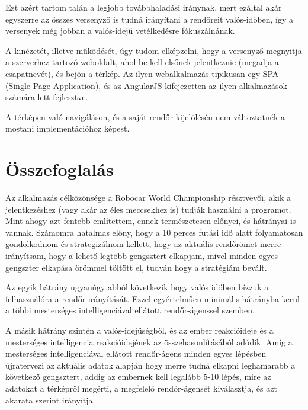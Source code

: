 \documentclass[a4paper,12pt]{report}
\begin{document}
\vspace{2mm}
Ezt azért tartom talán a legjobb továbbhaladási iránynak, mert ezáltal akár egyszerre az összes versenyző is tudná irányítani a rendőreit valós-időben, így a versenyek még jobban a valós-idejű vetélkedésre fókuszálnának.

\vspace{2mm}
A kinézetét, illetve működését, úgy tudom elképzelni, hogy a versenyző megnyitja a szerverhez tartozó weboldalt, ahol be kell elsőnek jelentkeznie (megadja a csapatnevét), és bejön a térkép. Az ilyen webalkalmazás tipikusan egy SPA (Single Page Application), és az AngularJS kifejezetten az ilyen alkalmazások számára lett fejlesztve.

\vspace{2mm}
A térképen való navigáláson, és a saját rendőr kijelölésén nem változtatnék a mostani implementációhoz képest.

\newpage
\chapter{Összefoglalás}
\label{summary}

Az alkalmazás célközönsége a Robocar World Championship résztvevői, akik a jelentkezéshez (vagy akár az éles meccsekhez is) tudják használni a programot. Mint ahogy azt fentebb említettem, ennek természetesen előnyei, és hátrányai is vannak. Számomra hatalmas előny, hogy a 10 perces futási idő alatt folyamatosan gondolkodnom és strategizálnom kellett, hogy az aktuális rendőrömet merre irányítsam, hogy a lehető legtöbb gengsztert elkapjam, mivel minden egyes gengszter elkapása örömmel töltött el, tudván hogy a stratégiám bevált.

\vspace{2mm}
Az egyik hátrány ugyanúgy abból következik hogy valós időben bízzuk a felhasználóra a rendőr irányítását. Ezzel egyértelműen minimális hátrányba kerül a többi mesterséges intelligenciával ellátott rendőr-ágenssel szemben.

\vspace{2mm}
A másik hátrány szintén a valós-idejűségből, és az ember reakcióideje és a mesterséges intelligencia reakcióidejének az összehasonlításából adódik. Amíg a mesterséges intelligenciával ellátott rendőr-ágens minden egyes lépésben újratervezi az aktuális adatok alapján hogy merre tudná elkapni leghamarabb a következő gengsztert, addig az embernek kell legalább 5-10 lépés, mire az adatokat a térképről megérti, a megfelelő rendőr-ágensét kiválasztja, és azt akarata szerint irányítja.
\end{document}
